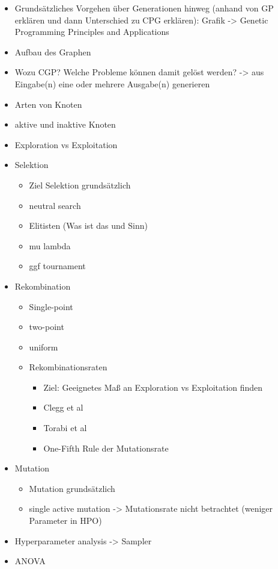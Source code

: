 \begin{itemize}
    \item Grundsätzliches Vorgehen über Generationen hinweg (anhand von GP erklären und dann Unterschied zu CPG erklären): Grafik -> \glqq Genetic Programming Principles and Applications\grqq
    \item Aufbau des Graphen
    \item Wozu CGP? Welche Probleme können damit gelöst werden? -> aus Eingabe(n) eine oder mehrere Ausgabe(n) generieren
    \item Arten von Knoten
    \item aktive und inaktive Knoten
    \item Exploration vs Exploitation
    \item Selektion
    \begin{itemize}
        \item Ziel Selektion grundsätzlich
        \item neutral search
        \item Elitisten (Was ist das und Sinn)
        \item mu lambda
        \item ggf tournament
    \end{itemize}
    \item Rekombination
    \begin{itemize}
        \item Single-point
        \item two-point
        \item uniform
        \item Rekombinationsraten
        \begin{itemize}
            \item Ziel: Geeignetes Maß an Exploration vs Exploitation finden
            \item Clegg et al
            \item Torabi et al
            \item One-Fifth Rule der Mutationsrate
        \end{itemize}
    \end{itemize}
    \item Mutation
    \begin{itemize}
        \item Mutation grundsätzlich
        \item single active mutation -> Mutationsrate nicht betrachtet (weniger Parameter in HPO)
    \end{itemize}
    \item Hyperparameter analysis -> Sampler
    \item ANOVA
\end{itemize}
